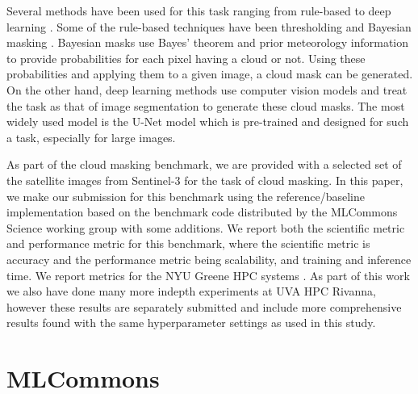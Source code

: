 \documentclass[sigplan,screen]{acmart}
\begin{document}
Several methods have been used for this task ranging from rule-based \cite{Saunders1986AnAS,Saunders1988AnIM,Merchant2005ProbabilisticPB, Zhu2012ObjectbasedCA} to deep learning \cite{Li2019DeepLB,Domnich2021KappaMaskAC,Yan2018CloudAC,WIELAND2019111203,JEPPESEN2019247}. Some of the rule-based techniques have been thresholding \cite{Saunders1986AnAS,Saunders1988AnIM} and Bayesian masking \cite{Merchant2005ProbabilisticPB}. Bayesian masks use Bayes' theorem and prior meteorology information to provide probabilities for each pixel having a cloud or not. Using these probabilities and applying them to a given image, a cloud mask can be generated. On the other hand, deep learning methods \cite{Li2019DeepLB,Domnich2021KappaMaskAC,Yan2018CloudAC,WIELAND2019111203,JEPPESEN2019247} use computer vision models and treat the task as that of image segmentation to generate these cloud masks. The most widely used model is the U-Net \cite{Ronneberger2015UNetCN} model which is pre-trained and designed for such a task, especially for large images.


As part of the cloud masking benchmark, we are provided with  a selected set of the satellite images from Sentinel-3 for the task of cloud masking. In this paper, we make our submission for this benchmark using the reference/baseline implementation based on the benchmark code distributed by the MLCommons Science working group with some additions. We report both the scientific metric and performance metric for this benchmark, where the scientific metric is accuracy and the performance metric being scalability, and training and inference time. We report metrics for the NYU Greene HPC systems \cite{www-greene}. As part of this work we also have done many more indepth experiments at UVA HPC Rivanna, however these results are separately submitted and include more comprehensive results found with the same hyperparameter settings as used in this study.

\section{MLCommons}
\end{document}
